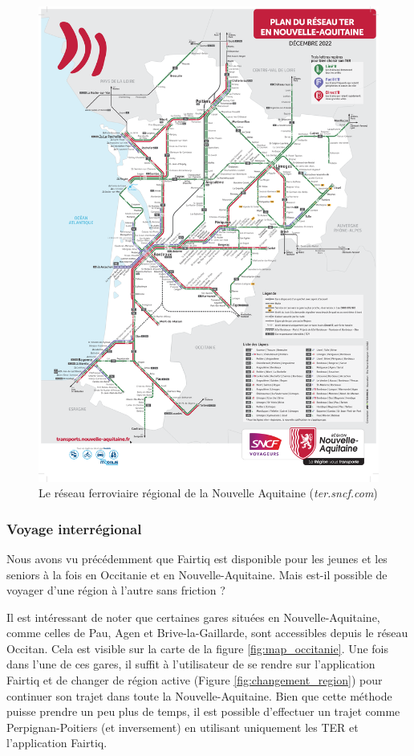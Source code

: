 \documentclass[a4paper]{article}
\begin{document}
\begin{figure}
  \centering
  \includegraphics[width=\textwidth]{illustrations/images/offres/nouvelle-aquitaine/carte_reseau.png}
  \caption{\centering Le réseau ferroviaire régional de la Nouvelle Aquitaine (\textit{ter.sncf.com})}
  \label{fig:map_nouvelle_aquitaine}
\end{figure}

\clearpage
\subsubsection{Voyage interrégional}
Nous avons vu précédemment que Fairtiq est disponible pour les jeunes et les seniors à
la fois en Occitanie et en Nouvelle-Aquitaine.
Mais est-il possible de voyager d'une région à l'autre sans friction ?


Il est intéressant de noter que certaines gares situées en Nouvelle-Aquitaine,
comme celles de Pau, Agen et Brive-la-Gaillarde, sont accessibles depuis le réseau Occitan.
Cela est visible sur la carte de la figure \ref*{fig:map_occitanie}.
Une fois dans l'une de ces gares, il suffit à l'utilisateur de se rendre sur l'application Fairtiq et
de changer de région active (Figure \ref*{fig:changement_region})
pour continuer son trajet dans toute la Nouvelle-Aquitaine.
Bien que cette méthode puisse prendre un peu plus de temps, il est possible d'effectuer un trajet comme Perpignan-Poitiers (et inversement) en utilisant uniquement les TER et l'application Fairtiq.
\end{document}
